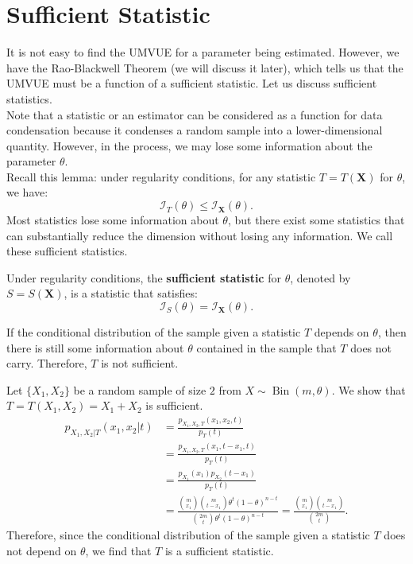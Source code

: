 \documentclass{huhtakm-template-book-v2}
\DeclareMathOperator{\Bin}{Bin}
\begin{document}
\section{Sufficient Statistic}
    It is not easy to find the UMVUE for a parameter being estimated. However, we have the Rao-Blackwell Theorem (we will discuss it later), which tells us that the UMVUE must be a function of a sufficient statistic. Let us discuss sufficient statistics.\\
    Note that a statistic or an estimator can be considered as a function for data condensation because it condenses a random sample into a lower-dimensional quantity. However, in the process, we may lose some information about the parameter $\theta$.\\
    Recall this lemma: under regularity conditions, for any statistic $T = T(\mathbf{X})$ for $\theta$, we have:
    \begin{equation*}
        \mathcal{I}_{T}(\theta) \leq \mathcal{I}_{\mathbf{X}}(\theta).
    \end{equation*}
    Most statistics lose some information about $\theta$, but there exist some statistics that can substantially reduce the dimension without losing any information. We call these sufficient statistics.
    \begin{defn}
        Under regularity conditions, the \textbf{sufficient statistic} for $\theta$, denoted by $S = S(\mathbf{X})$, is a statistic that satisfies:
        \begin{equation*}
            \mathcal{I}_{S}(\theta) = \mathcal{I}_{\mathbf{X}}(\theta).
        \end{equation*}
    \end{defn}
    \begin{rem}
        If the conditional distribution of the sample given a statistic $T$ depends on $\theta$, then there is still some information about $\theta$ contained in the sample that $T$ does not carry. Therefore, $T$ is not sufficient.
    \end{rem}
    \begin{eg}
        Let $\{X_{1}, X_{2}\}$ be a random sample of size $2$ from $X \sim \Bin(m, \theta)$. We show that $T = T(X_{1}, X_{2}) = X_{1} + X_{2}$ is sufficient.
        \begin{align*}
            p_{X_{1}, X_{2} | T}(x_{1}, x_{2} | t) &= \frac{p_{X_{1}, X_{2}, T}(x_{1}, x_{2}, t)}{p_{T}(t)}\\
            &= \frac{p_{X_{1}, X_{2}, T}(x_{1}, t - x_{1}, t)}{p_{T}(t)}\\
            &= \frac{p_{X_{1}}(x_{1})p_{X_{2}}(t - x_{1})}{p_{T}(t)}\\
            &= \frac{\binom{m}{x_{1}}\binom{m}{t - x_{1}}\theta^{t}(1 - \theta)^{n - t}}{\binom{2m}{t}\theta^{t}(1 - \theta)^{n - t}} = \frac{\binom{m}{x_{1}}\binom{m}{t - x_{1}}}{\binom{2m}{t}}.
        \end{align*}
        Therefore, since the conditional distribution of the sample given a statistic $T$ does not depend on $\theta$, we find that $T$ is a sufficient statistic.
    \end{eg}
\end{document}
